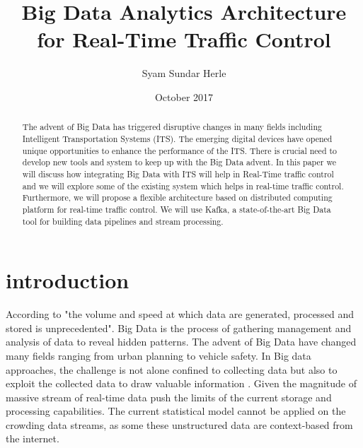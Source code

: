 \documentclass[sigconf]{acmart}
\begin{document}
\title{Big Data Analytics Architecture for Real-Time Traffic Control}
 
 \author{Syam Sundar Herle}
 
 
 
 
 \date{October 2017}


\begin{abstract}
The advent of Big Data has triggered disruptive
changes in many fields including Intelligent Transportation
Systems (ITS). The emerging digital devices have opened unique opportunities  to enhance the performance of the ITS. There is crucial need to develop new tools and system to keep up with the Big Data advent. In this paper we will discuss how integrating Big Data with ITS will help in Real-Time traffic control and we will explore some of the existing system which helps in real-time traffic control. Furthermore, we will propose a flexible architecture based on distributed computing platform for real-time traffic control. We will use Kafka, a state-of-the-art Big
Data tool for building data pipelines and stream processing.
\end{abstract}




\maketitle

\section{introduction}

According to \cite{wwwbigdata} "the volume and speed at which data are generated, processed and stored is unprecedented". Big Data is the process of gathering management and analysis of data to reveal hidden patterns. The advent of Big Data have changed many fields ranging from urban planning to vehicle safety. In Big data approaches, the challenge is not alone confined to collecting data but also to exploit the collected data to draw valuable information . Given the magnitude of massive stream of real-time data push the limits of the current storage and processing capabilities. The current statistical model cannot be applied on the crowding data streams, as some these unstructured data \cite{unstruct} are context-based from the internet.
\end{document}
